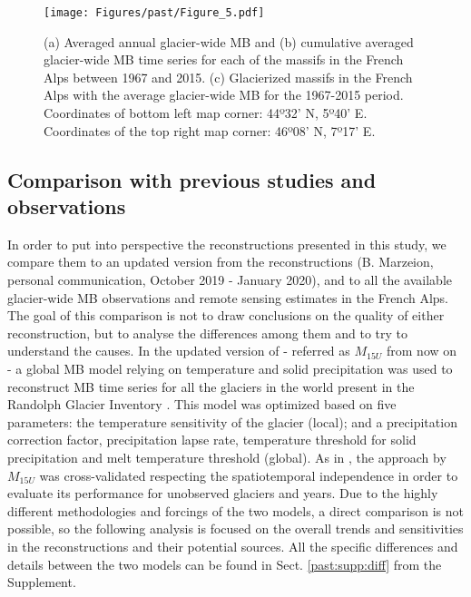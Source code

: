 {\begin{figure}[t]
\centering
\texttt{[image: Figures/past/Figure\_5.pdf]}
\captionsetup{justification=centering}
\caption{(a) Averaged annual glacier-wide MB and (b) cumulative averaged glacier-wide MB time series for each of the massifs in the French Alps between 1967 and 2015. (c) Glacierized massifs in the French Alps with the average glacier-wide MB for the 1967-2015 period. Coordinates of bottom left map corner: 44º32' N, 5º40' E. Coordinates of the top right map corner: 46º08' N, 7º17' E.}
\label{past:fig5}
\end{figure}

\subsection{Comparison with previous studies and observations} \label{past:overview:comparison}

In order to put into perspective the reconstructions presented in this study, we compare them to an updated version from the \citet{marzeion_brief_2015} reconstructions (B. Marzeion, personal communication, October 2019 - January 2020), and to all the available glacier-wide MB observations and remote sensing estimates in the French Alps. The goal of this comparison is not to draw conclusions on the quality of either reconstruction, but to analyse the differences among them and to try to understand the causes. In the updated version of \citet{marzeion_brief_2015} - referred as $M_{15U}$ from now on -  a global MB model relying on temperature and solid precipitation was used to reconstruct MB time series for all the glaciers in the world present in the Randolph Glacier Inventory \citep{consortium_randolph_2017}. This model was optimized based on five parameters: the temperature sensitivity of the glacier (local); and a precipitation correction factor, precipitation lapse rate, temperature threshold for solid precipitation and melt temperature threshold (global). As in \citet{bolibar_deep_2020-1}, the approach by $M_{15U}$ was cross-validated respecting the spatiotemporal independence in order to evaluate its performance for unobserved glaciers and years. Due to the highly different methodologies and forcings of the two models, a direct comparison is not possible, so the following analysis is focused on the overall trends and sensitivities in the reconstructions and their potential sources. All the specific differences and details between the two models can be found in Sect. \ref{past:supp:diff} from the Supplement. 

}
